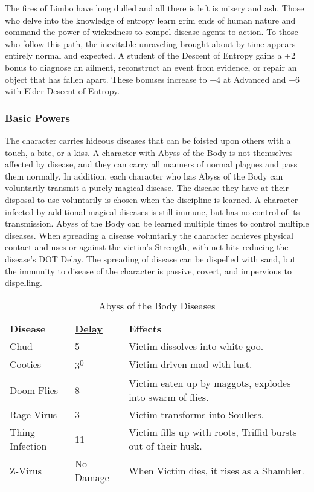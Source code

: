 The fires of Limbo have long dulled and all there is left is misery and ash. Those who delve into the knowledge of entropy learn grim ends of human nature and command the power of wickedness to compel disease agents to action. To those who follow this path, the inevitable unraveling brought about by time appears entirely normal and expected. A student of the Descent of Entropy gains a +2 bonus to diagnose an ailment, reconstruct an event from evidence, or repair an object that has fallen apart. These bonuses increase to +4 at Advanced and +6 with Elder Descent of Entropy.

\subsubsection{Basic Powers}

 The character carries hideous diseases that can be foisted upon others with a touch, a bite, or a kiss. A character with Abyss of the Body is not themselves affected by disease, and they can carry all manners of normal plagues and pass them normally. In addition, each character who has Abyss of the Body can voluntarily transmit a purely magical disease. The disease they have at their disposal to use voluntarily is chosen when the discipline is learned. A character infected by additional magical diseases is still immune, but has no control of its transmission. Abyss of the Body can be learned multiple times to control multiple diseases. When spreading a disease voluntarily the character achieves physical contact and uses  or  against the victim's Strength, with net hits reducing the disease's DOT Delay. The spreading of disease can be dispelled with sand, but the immunity to disease of the character is passive, covert, and impervious to dispelling.


\begin{table}[htb]
 \caption{Abyss of the Body Diseases} \centering
\begin{tabular}{l l l}
\textbf{Disease} & \hyperref[subsection:Damage-Over-Time]{\textbf{Delay}} & \textbf{Effects}\\
Chud & 5 & Victim dissolves into white goo.\\
Cooties & 3\textsuperscript{0}  & Victim driven mad with lust.\\
Doom Flies & 8 & Victim eaten up by maggots, explodes into swarm of flies.\\
Rage Virus & 3 & Victim transforms into Soulless.\\
Thing Infection & 11 & Victim fills up with roots, Triffid bursts out of their husk.\\
Z-Virus & No Damage & When Victim dies, it rises as a Shambler.\\
\end{tabular}
\end{table}

